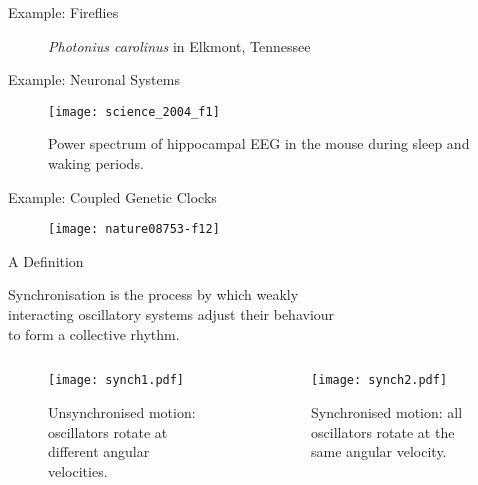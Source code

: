 \documentclass[11pt,reqno]{beamer}
\newcommand{\includemovie}[3]{%
	\includemedia[%
	width=#1,height=#2,%
	activate=pagevisible,%
	deactivate=pageclose,%
	addresource=#3,%
	flashvars={%
		src=#3 %
		&autoPlay=true %
		&loop=true %
		&controlBarAutoHideTimeout=0 %
	}%
	]{}{StrobeMediaPlayback.swf}%
}
\begin{document}
\begin{frame}{Example: Fireflies\cite{Yiu2017}}
\begin{figure}
\caption{\emph{Photonius carolinus} in Elkmont, Tennessee}
\end{figure}
\end{frame}
\begin{frame}{Example: Neuronal Systems\cite{Buzsaki:2004aa}}
\begin{figure}
\texttt{[image: science\_2004\_f1]}
\caption{Power spectrum of hippocampal EEG in the mouse during sleep and waking periods.}
\end{figure}
\end{frame}
\begin{frame}{Example: Coupled Genetic Clocks\cite{Danino:2010aa}}
\begin{figure}
\texttt{[image: nature08753-f12]}
\end{figure}
\end{frame}
\begin{frame}{A Definition}

\begin{tcolorbox}[notitle, boxrule=0pt, colback=lred]
\centering
	Synchronisation is the process by which weakly\\ interacting oscillatory systems adjust their behaviour\\ to form a collective rhythm.
\end{tcolorbox}
	\begin{columns}
		\scriptsize
	\begin{column}{0.49\textwidth}
		\begin{figure}
			\texttt{[image: synch1.pdf]}
			\caption{Unsynchronised motion: oscillators rotate at different angular velocities.}
		\end{figure}
	\end{column}
	\begin{column}{0.49\textwidth}
		\begin{figure}
			\texttt{[image: synch2.pdf]}
			\caption{Synchronised motion: all oscillators rotate at the same angular velocity.}
		\end{figure}
	\end{column}
\end{columns}
\end{frame}
\end{document}
